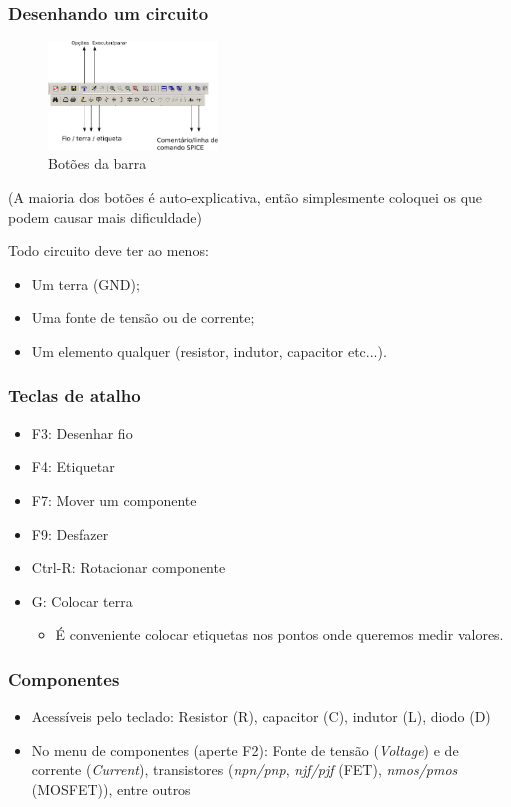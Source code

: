 \documentclass{beamer}
\begin{document}
\begin{frame} %
\frametitle{Desenhando um circuito}
\begin{figure}[htb]
\includegraphics[width=170px]{images/botoes_barra}
\caption{Botões da barra}
\label{fig:botoesbarra}
\end{figure}
(A maioria dos botões é auto-explicativa, então simplesmente coloquei os que podem causar mais dificuldade)
\end{frame}

\begin{frame} %
Todo circuito deve ter ao menos:
\begin{itemize}
\item Um terra (GND);
\item Uma fonte de tensão ou de corrente;
\item Um elemento qualquer (resistor, indutor, capacitor etc...).
\end{itemize}
\end{frame}

\begin{frame} %
\frametitle{Teclas de atalho}
\begin{itemize}
\item{F3:} Desenhar fio
\item{F4:} Etiquetar
\item{F7:} Mover um componente
\item{F9:} Desfazer 
\item{Ctrl-R:} Rotacionar componente
\item{G:} Colocar terra
\begin{itemize}
\item{É conveniente colocar etiquetas nos pontos onde queremos medir valores.}
\end{itemize}
\end{itemize}
\end{frame}

\begin{frame} %
\frametitle{Componentes}
\begin{itemize}
\item {Acessíveis pelo teclado:} Resistor (R), capacitor (C), indutor (L), diodo (D)
\item {No menu de componentes (aperte F2)}: Fonte de tensão (\textit{Voltage}) e de corrente (\textit{Current}), transistores (\textit{npn/pnp}, \textit{njf/pjf} (FET), \textit{nmos/pmos} (MOSFET)), entre outros
\end{itemize}
\end{frame}
\end{document}
